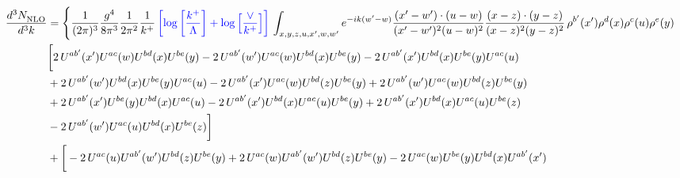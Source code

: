 \documentclass[aps,prd,amsmath,amssymb,nofootinbib]{revtex4-2}
\numberwithin{equation}{section}
\begin{document}
\begin{align}
   \frac{d^{3}N_{\rm NLO}^{\rm}}{d^{3}k}  & =  \Bigg\{\frac{1}{(2\pi)^{3}}\frac{g^{4}}{8\pi^{3}}\frac{1}{2\pi^{2}} \frac{1}{k^{+}}\,{\color{blue}\left[\log{\left[\frac{k^{+}}{\Lambda}\right]}+\log{\left[\frac{\vee}{k^{+}}\right]}\right]}\,\int_{x,y,z,u,x^{\prime},w,w^{\prime}}e^{-ik(w^{\prime}-w)}\frac{(x^{\prime}-w^{\prime})\cdot (u-w)}{(x^{\prime}-w^{\prime})^{2} (u-w)^{2}} \frac{(x-z)\cdot (y-z)}{(x-z)^{2}(y-z)^{2}}\,\rho^{b^{\prime}}(x^{\prime})\rho^{d}(x)\rho^{c}(u)\rho^{e}(y)\notag \\ & \bigg[2\,U^{ab'}(x')U^{ac}(w)U^{bd}(x)U^{be}(y) -2\, U^{ab'}(w')U^{ac}(w)U^{bd}(x)U^{be}(y) - 2\,U^{ab'}(x')U^{bd}(x)U^{be}(y)U^{ac}(u) \notag \\  & + 2\, U^{ab'}(w')U^{bd}(x)U^{be}(y)U^{ac}(u)-2\,U^{ab'}(x')U^{ac}(w)U^{bd}(z)U^{be}(y) + 2\,U^{ab'}(w')U^{ac}(w)U^{bd}(z)U^{be}(y) \notag \\ &+2\,U^{ab'}(x')U^{be}(y)U^{bd}(x)U^{ac}(u) -2\,U^{ab'}(x')U^{bd}(x)U^{ac}(u)U^{be}(y) +2\, U^{ab'}(x')U^{bd}(x)U^{ac}(u)U^{be}(z) \notag \\ & - 2\,U^{ab'}(w')U^{ac}(u)U^{bd}(x)U^{be}(z)\bigg]\notag \\ & + \bigg[-2\,U^{ac}(u)U^{ab'}(w')U^{bd}(z)U^{be}(y) + 2\,U^{ac}(w)U^{ab'}(w')U^{bd}(z)U^{be}(y) - 2\,U^{ac}(w)U^{be}(y)U^{bd}(x)U^{ab'}(x') \notag \\

\end{align}
\end{document}
